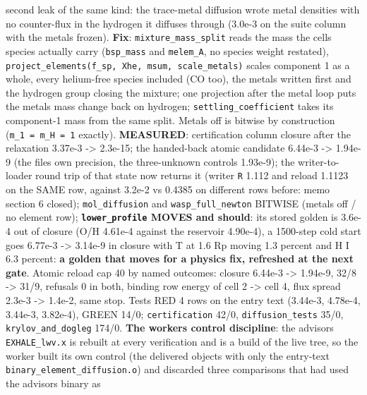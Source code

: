 \documentclass[english,a4paper]{my_memo}
\begin{document}
\begin{itemize}
  second leak of the same kind: the trace-metal diffusion wrote metal densities
  with no counter-flux in the hydrogen it diffuses through (3.0e-3 on the
  suite column with the metals frozen). \textbf{Fix}: \texttt{mixture\_mass\_split} reads
  the mass the cell\textquotesingle s species actually carry (\texttt{bsp\_mass} and \texttt{melem\_A}, no
  species weight restated), \texttt{project\_elements(f\_sp,\ Xhe,\ msum,\ scale\_metals)}
  scales component 1 as a whole, every helium-free species included (CO
  too), the metals written first and the hydrogen group closing the mixture;
  one projection after the metal loop puts the metals\textquotesingle{} mass change back on
  hydrogen; \texttt{settling\_coefficient} takes its component-1 mass from the same
  split. Metals off is bitwise by construction (\texttt{m\_1\ =\ m\_H\ =\ 1} exactly).
  \textbf{MEASURED}: certification column closure after the relaxation 3.37e-3 -\textgreater{}
  2.3e-15; the handed-back atomic candidate 6.44e-3 -\textgreater{} 1.94e-9 (the file\textquotesingle s
  own precision, the three-unknown control\textquotesingle s 1.93e-9); the writer-to-loader
  round trip of that state now returns it (writer \texttt{\textbar{}\textbar{}R\textbar{}\textbar{}} 1.112 and reload
  1.1123 on the SAME row, against 3.2e-2 vs 0.4385 on different rows before:
  memo section 6 closed); \texttt{mol\_diffusion} and \texttt{wasp\_full\_newton} BITWISE
  (metals off / no element row); \textbf{\texttt{lower\_profile} MOVES and should}: its
  stored golden is 3.6e-4 out of closure (O/H 4.61e-4 against the reservoir
  4.90e-4), a 1500-step cold start goes 6.77e-3 -\textgreater{} 3.14e-9 in closure with
  T at 1.6 Rp moving 1.3 percent and H I 6.3 percent: \textbf{a golden that moves
  for a physics fix, refreshed at the next gate}. Atomic reload cap 40 by
  named outcomes: closure 6.44e-3 -\textgreater{} 1.94e-9, 32/8 -\textgreater{} 31/9, refusals 0 in
  both, binding row energy of cell 2 -\textgreater{} cell 4, flux spread 2.3e-3 -\textgreater{}
  1.4e-2, same stop. Tests RED 4 rows on the entry text (3.44e-3, 4.78e-4,
  3.44e-3, 3.82e-4), GREEN 14/0; \texttt{certification} 42/0, \texttt{diffusion\_tests}
  35/0, \texttt{krylov\_and\_dogleg} 174/0. \textbf{The worker\textquotesingle s control discipline}: the
  advisor\textquotesingle s \texttt{EXHALE\_lwv.x} is rebuilt at every verification and is a build
  of the live tree, so the worker built its own control (the delivered
  objects with only the entry-text \texttt{binary\_element\_diffusion.o}) and
  discarded three comparisons that had used the advisor\textquotesingle s binary as

\end{itemize}
\end{document}

